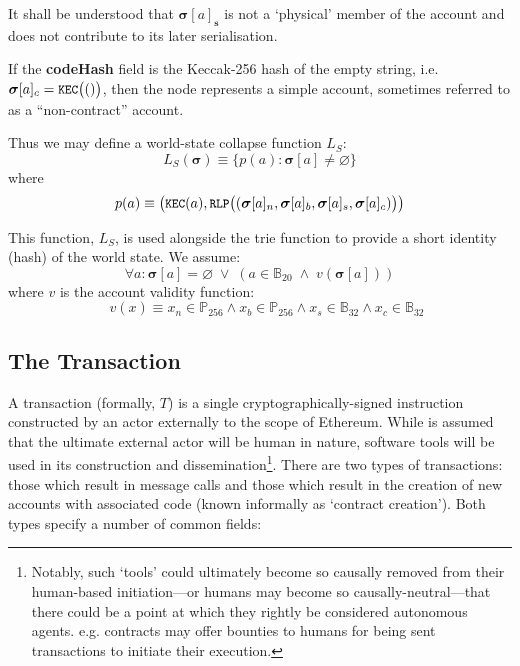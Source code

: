 \documentclass[9pt,oneside]{amsart}
\makeatletter
\newcommand*\eg{e.g.\@\xspace}
\makeatother
\begin{document}
\begin{multicols}{2}
It shall be understood that $\boldsymbol{\sigma}[a]_\mathbf{s}$ is not a `physical' member of the account and does not contribute to its later serialisation.

If the \textbf{codeHash} field is the Keccak-256 hash of the empty string, i.e. $\boldsymbol{\sigma}[a]_c = \texttt{\small KEC}\big(()\big)$, then the node represents a simple account, sometimes referred to as a ``non-contract'' account.

Thus we may define a world-state collapse function $L_S$:
\begin{equation}
L_S(\boldsymbol{\sigma}) \equiv \{ p(a): \boldsymbol{\sigma}[a] \neq \varnothing \}
\end{equation}
where
\begin{equation}
p(a) \equiv  \big(\texttt{\small KEC}(a), \texttt{\small RLP}\big( (\boldsymbol{\sigma}[a]_n, \boldsymbol{\sigma}[a]_b, \boldsymbol{\sigma}[a]_s, \boldsymbol{\sigma}[a]_c) \big) \big)
\end{equation}

This function, $L_S$, is used alongside the trie function to provide a short identity (hash) of the world state. We assume:
\begin{equation}
\forall a: \boldsymbol{\sigma}[a] = \varnothing \; \vee \; (a \in \mathbb{B}_{20} \; \wedge \; v(\boldsymbol{\sigma}[a]))
\end{equation}
where $v$ is the account validity function:
\begin{equation}
\quad v(x) \equiv x_n \in \mathbb{P}_{256} \wedge x_b \in \mathbb{P}_{256} \wedge x_s \in \mathbb{B}_{32} \wedge x_c \in \mathbb{B}_{32}
\end{equation}

\subsection{The Transaction} \label{ch:transaction}

A transaction (formally, $T$) is a single cryptographically-signed instruction constructed by an actor externally to the scope of Ethereum. While is assumed that the ultimate external actor will be human in nature, software tools will be used in its construction and dissemination\footnote{Notably, such `tools' could ultimately become so causally removed from their human-based initiation---or humans may become so causally-neutral---that there could be a point at which they rightly be considered autonomous agents. \eg contracts may offer bounties to humans for being sent transactions to initiate their execution.}. There are two types of transactions: those which result in message calls and those which result in the creation of new accounts with associated code (known informally as `contract creation'). Both types specify a number of common fields:


\end{multicols}
\end{document}
